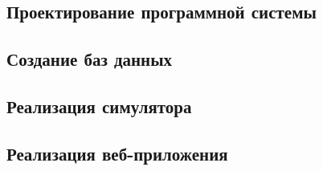 \subsection{Проектирование программной системы}


\subsection{Создание баз данных}


\subsection{Реализация симулятора}


\subsection{Реализация веб-приложения}

